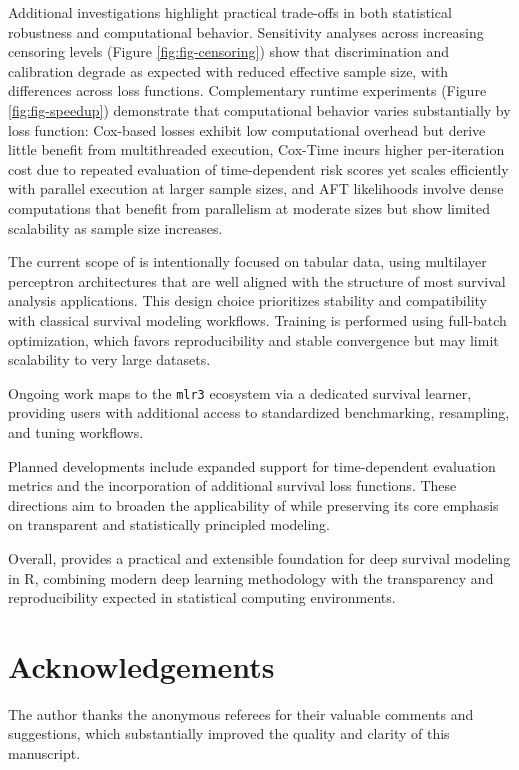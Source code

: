 Additional investigations highlight practical trade-offs in both statistical robustness and computational behavior. Sensitivity analyses across increasing censoring levels (Figure \ref{fig:fig-censoring}) show that discrimination and calibration degrade as expected with reduced effective sample size, with differences across loss functions. Complementary runtime experiments (Figure \ref{fig:fig-speedup}) demonstrate that computational behavior varies substantially by loss function: Cox-based losses exhibit low computational overhead but derive little benefit from multithreaded execution, Cox-Time incurs higher per-iteration cost due to repeated evaluation of time-dependent risk scores yet scales efficiently with parallel execution at larger sample sizes, and AFT likelihoods involve dense computations that benefit from parallelism at moderate sizes but show limited scalability as sample size increases.

The current scope of  is intentionally focused on tabular data, using multilayer perceptron architectures \citep{bengio2021deep} that are well aligned with the structure of most survival analysis applications. This design choice prioritizes stability and compatibility with classical survival modeling workflows. Training is performed using full-batch optimization, which favors reproducibility and stable convergence but may limit scalability to very large datasets.

Ongoing work maps  to the \texttt{mlr3} ecosystem \citep{mlr3} via a dedicated survival learner, providing users with additional access to standardized benchmarking, resampling, and tuning workflows.

Planned developments include expanded support for time-dependent evaluation metrics \citep{uno2007evaluating, blanche2013estimating} and the incorporation of additional survival loss functions. These directions aim to broaden the applicability of  while preserving its core emphasis on transparent and statistically principled modeling.

Overall,  provides a practical and extensible foundation for deep survival modeling in R, combining modern deep learning methodology with the transparency and reproducibility expected in statistical computing environments.

\section{Acknowledgements}\label{acknowledgements}

The author thanks the anonymous referees for their valuable comments and suggestions, which substantially improved the quality and clarity of this manuscript.



\address{%
Imad EL BADISY\\
AI and Data Science Service, Mohammed VI Center for Research and Innovation (CM6RI)\\%
Rabat, Morocco\\
%
%
\textit{ORCiD: \href{https://orcid.org/0000-0003-4848-4895}{0000-0003-4848-4895}}\\%
\href{mailto:elbadisyimad@gmail.com}{\nolinkurl{elbadisyimad@gmail.com}}%
}
